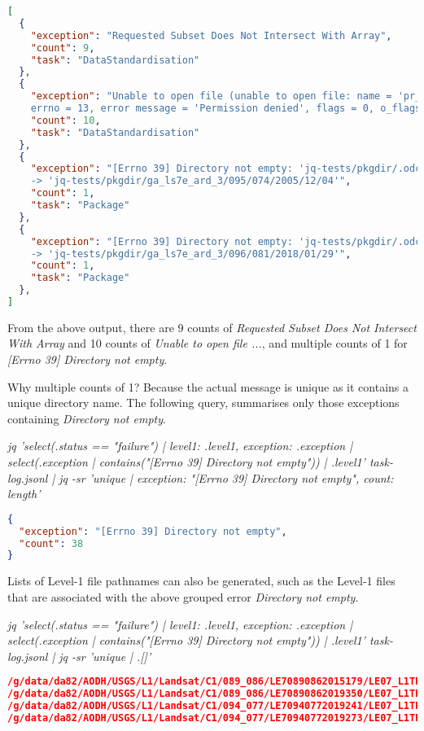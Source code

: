\documentclass[a4paper,oneside,titlepage]{article}
\begin{document}
    \begin{lstlisting}[basicstyle=\tiny, language=json]
[
  {
    "exception": "Requested Subset Does Not Intersect With Array",
    "count": 9,
    "task": "DataStandardisation"
  },
  {
    "exception": "Unable to open file (unable to open file: name = 'pr_wtr.eatm.2020.h5',
    errno = 13, error message = 'Permission denied', flags = 0, o_flags = 0)",
    "count": 10,
    "task": "DataStandardisation"
  },
  {
    "exception": "[Errno 39] Directory not empty: 'jq-tests/pkgdir/.odcdataset-04io7y6f'
    -> 'jq-tests/pkgdir/ga_ls7e_ard_3/095/074/2005/12/04'",
    "count": 1,
    "task": "Package"
  },
  {
    "exception": "[Errno 39] Directory not empty: 'jq-tests/pkgdir/.odcdataset-09alscsi'
    -> 'jq-tests/pkgdir/ga_ls7e_ard_3/096/081/2018/01/29'",
    "count": 1,
    "task": "Package"
  },
]
    \end{lstlisting}

    \begin{flushleft}
      From the above output, there are 9 counts of \textit{Requested Subset Does Not Intersect With Array} and 10 counts of \textit{Unable to open file ...}, and multiple counts of 1 for \textit{[Errno 39] Directory not empty}. \par
      Why multiple counts of 1? Because the actual message is unique as it contains a unique directory name.
      The following query, summarises only those exceptions containing \textit{Directory not empty}. \par
      \textit{{\tiny jq 'select(.status == "failure") |
      {level1: .level1, exception: .exception} |
      select(.exception | contains("[Errno 39] Directory not empty")) |
      .level1' task-log.jsonl | jq -sr 'unique |
      {exception: "[Errno 39] Directory not empty", count: length}'}}
    \end{flushleft}

    \begin{lstlisting}[basicstyle=\tiny, language=json]
{
  "exception": "[Errno 39] Directory not empty",
  "count": 38
}
    \end{lstlisting}

    \begin{flushleft}
      Lists of Level-1 file pathnames can also be generated, such as the Level-1 files that are associated with the above grouped error \textit{Directory not empty}. \par
      \textit{{\tiny jq 'select(.status == "failure") |
      {level1: .level1, exception: .exception} |
      select(.exception | contains("[Errno 39] Directory not empty")) |
      .level1' task-log.jsonl | jq -sr 'unique | .[]'}}
    \end{flushleft}

    \begin{lstlisting}[basicstyle=\tiny, language=json]
/g/data/da82/AODH/USGS/L1/Landsat/C1/089_086/LE70890862015179/LE07_L1TP_089086_20150628_20161024_01_T1.tar
/g/data/da82/AODH/USGS/L1/Landsat/C1/089_086/LE70890862019350/LE07_L1TP_089086_20191216_20200112_01_T1.tar
/g/data/da82/AODH/USGS/L1/Landsat/C1/094_077/LE70940772019241/LE07_L1TP_094077_20190829_20190924_01_T1.tar
/g/data/da82/AODH/USGS/L1/Landsat/C1/094_077/LE70940772019273/LE07_L1TP_094077_20190930_20191027_01_T1.tar
    \end{lstlisting}
\end{document}
